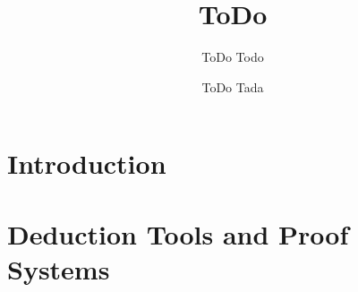 \documentclass{llncs}
\title{ ToDo }
\author{
  ToDo Todo \inst{1} 
  \and 
  ToDo Tada \inst{2}
}
\institute{
  ToDo\\
  \email{ }
  \and 
  ToDo \\
  \email{ }
}
\begin{document}
\maketitle


\section{Introduction}




\section{Deduction Tools and Proof Systems}






\end{document}
